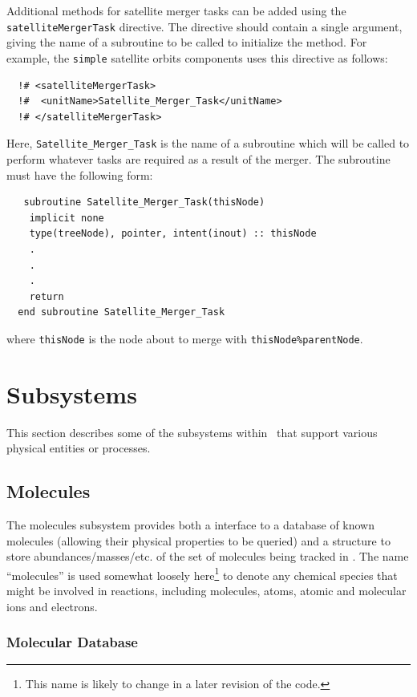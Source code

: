 Additional methods for satellite merger tasks can be added using the {\tt satelliteMergerTask} directive. The directive should contain a single argument, giving the name of a subroutine to be called to initialize the method. For example, the {\tt simple} satellite orbits components uses this directive as follows:
\begin{verbatim}
  !# <satelliteMergerTask>
  !#  <unitName>Satellite_Merger_Task</unitName>
  !# </satelliteMergerTask>
\end{verbatim}
Here, {\tt Satellite\_Merger\_Task} is the name of a subroutine which will be called to perform whatever tasks are required as a result of the merger. The subroutine must have the following form:
\begin{verbatim}
   subroutine Satellite_Merger_Task(thisNode)
    implicit none
    type(treeNode), pointer, intent(inout) :: thisNode
    .
    .
    .
    return
  end subroutine Satellite_Merger_Task
\end{verbatim}
where {\tt thisNode} is the node about to merge with {\tt thisNode\%parentNode}.

\section{Subsystems}

This section describes some of the subsystems within \glc\ that support various physical entities or processes.

\subsection{Molecules}\label{sec:MolecularSubsystem}

The molecules subsystem provides both a interface to a database of known molecules (allowing their physical properties to be queried) and a structure to store abundances/masses/etc. of the set of molecules being tracked in \glc. The name ``molecules'' is used somewhat loosely here\footnote{This name is likely to change in a later revision of the code.} to denote any chemical species that might be involved in reactions, including molecules, atoms, atomic and molecular ions and electrons.

\subsubsection{Molecular Database}

